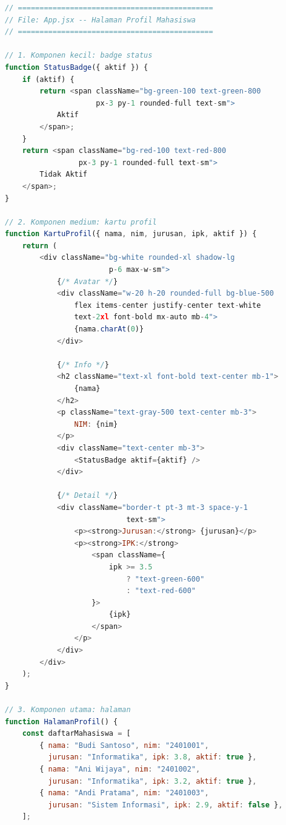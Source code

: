 \begin{lstlisting}[language=JavaScript, caption={Demo lengkap: Halaman Profil Mahasiswa dalam React}, label={lst:13-demo-lengkap}]
// =============================================
// File: App.jsx -- Halaman Profil Mahasiswa
// =============================================

// 1. Komponen kecil: badge status
function StatusBadge({ aktif }) {
    if (aktif) {
        return <span className="bg-green-100 text-green-800
                     px-3 py-1 rounded-full text-sm">
            Aktif
        </span>;
    }
    return <span className="bg-red-100 text-red-800
                 px-3 py-1 rounded-full text-sm">
        Tidak Aktif
    </span>;
}

// 2. Komponen medium: kartu profil
function KartuProfil({ nama, nim, jurusan, ipk, aktif }) {
    return (
        <div className="bg-white rounded-xl shadow-lg
                        p-6 max-w-sm">
            {/* Avatar */}
            <div className="w-20 h-20 rounded-full bg-blue-500
                flex items-center justify-center text-white
                text-2xl font-bold mx-auto mb-4">
                {nama.charAt(0)}
            </div>

            {/* Info */}
            <h2 className="text-xl font-bold text-center mb-1">
                {nama}
            </h2>
            <p className="text-gray-500 text-center mb-3">
                NIM: {nim}
            </p>
            <div className="text-center mb-3">
                <StatusBadge aktif={aktif} />
            </div>

            {/* Detail */}
            <div className="border-t pt-3 mt-3 space-y-1
                            text-sm">
                <p><strong>Jurusan:</strong> {jurusan}</p>
                <p><strong>IPK:</strong>
                    <span className={
                        ipk >= 3.5
                            ? "text-green-600"
                            : "text-red-600"
                    }>
                        {ipk}
                    </span>
                </p>
            </div>
        </div>
    );
}

// 3. Komponen utama: halaman
function HalamanProfil() {
    const daftarMahasiswa = [
        { nama: "Budi Santoso", nim: "2401001",
          jurusan: "Informatika", ipk: 3.8, aktif: true },
        { nama: "Ani Wijaya", nim: "2401002",
          jurusan: "Informatika", ipk: 3.2, aktif: true },
        { nama: "Andi Pratama", nim: "2401003",
          jurusan: "Sistem Informasi", ipk: 2.9, aktif: false },
    ];


\end{lstlisting}
